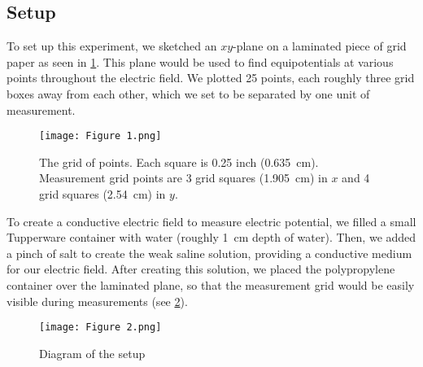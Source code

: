 \documentclass[10pt,journal,twoside]{IEEEtran}
\begin{document}
\subsection{Setup}
To set up this experiment, we sketched an $xy$-plane on a laminated piece of grid paper as seen in \cref{fig:1}. This plane would be used to find equipotentials at various points throughout the electric field. We plotted 25 points, each roughly three grid boxes away from each other, which we set to be separated by one unit of measurement.
\begin{figure}
\begin{center}
\texttt{[image: Figure 1.png]}
\end{center}
\caption{The grid of points. Each square is 0.25 inch (\qty{0.635}{\centi\meter}). Measurement grid points are 3 grid squares (\qty{1.905}{\centi\meter}) in $x$ and 4 grid squares (\qty{2.54}{\centi\meter}) in $y$.}
\label{fig:1}    
\end{figure}

To create a conductive electric field to measure electric potential, we filled a small Tupperware container with water (roughly \qty{1}{\centi\meter} depth of water). Then, we added a pinch of salt to create the weak saline solution, providing a conductive medium for our electric field. After creating this solution, we placed the polypropylene container over the laminated plane, so that the measurement grid would be easily visible during measurements (see \cref{fig:2}). 
\begin{figure}
\begin{center}
\texttt{[image: Figure 2.png]}
\end{center}
\caption{Diagram of the setup}
\label{fig:2}    
\end{figure}
\end{document}

